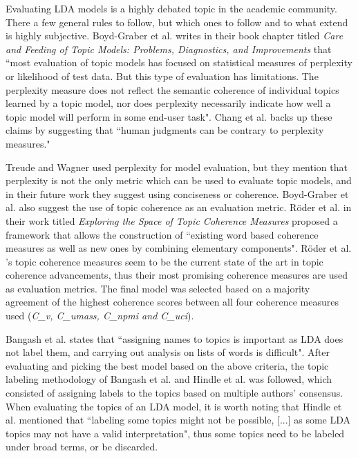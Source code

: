         Evaluating LDA models is a highly debated topic in the academic community. There a few general rules to follow, but which ones to follow and to what extend is highly subjective. Boyd-Graber et al. \cite{boyd2014care} writes in their book chapter titled \textit{Care and Feeding of Topic Models: Problems, Diagnostics, and Improvements} that ``most evaluation of topic models has focused on statistical measures of perplexity or likelihood of test data. But this type of evaluation has limitations. The perplexity measure does not reflect the semantic coherence of individual topics learned by a topic model, nor does perplexity necessarily indicate how well a topic model will perform in some end-user task". Chang et al. \cite{chang2009reading} backs up these claims by suggesting that ``human judgments can be contrary to perplexity measures." 
        
        Treude and Wagner \cite{treude2019predicting} used perplexity for model evaluation, but they mention that perplexity is not the only metric which can be used to evaluate topic models, and in their future work they suggest using conciseness or coherence. Boyd-Graber et al. \cite{boyd2014care} also suggest the use of topic coherence as an evaluation metric. R{\"o}der et al. \cite{roder2015exploring} in their work titled \textit{Exploring the Space of Topic Coherence Measures} proposed a framework that allows the construction of ``existing word based coherence measures as well as new ones by combining elementary components". R{\"o}der et al. \cite{roder2015exploring}'s topic coherence measures seem to be the current state of the art in topic coherence advancements, thus their most promising coherence measures are used as evaluation metrics. The final model was selected based on a majority agreement of the highest coherence scores between all four coherence measures used (\emph{C\_v, C\_umass, C\_npmi and C\_uci}).
        
        \label{topicLabeling} Bangash et al. \cite{bangash2019developers} states that ``assigning names to topics is important as LDA does not label them, and carrying out analysis on lists of words is difficult". After evaluating and picking the best model based on the above criteria, the topic labeling methodology of Bangash et al. \cite{bangash2019developers} and Hindle et al. \cite{hindle2012relating} was followed, which consisted of assigning labels to the topics based on multiple authors’ consensus. When evaluating the topics of an LDA model, it is worth noting that Hindle et al. \cite{hindle2012relating} mentioned that ``labeling some topics might not be possible, [...] as some LDA topics may not have a valid interpretation", thus some topics need to be labeled under broad terms, or be discarded.

